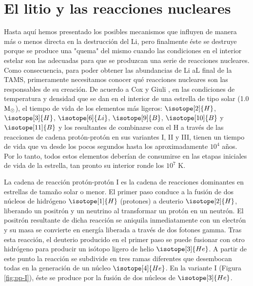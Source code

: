 \section{El litio y las reacciones nucleares} \label{sec:li_reac_nuc}
Hasta aquí hemos presentado los posibles mecanismos que influyen de manera más o menos directa en la destrucción del Li, pero finalmente éste se destruye porque se produce una "quema" del mismo cuando las condiciones en el interior estelar son las adecuadas para que se produzcan una serie de reacciones nucleares. Como consecuencia, para poder obtener las abundancias de Li aL final de la TAMS, primeramente necesitamos conocer qué reacciones nucleares son las responsables de su creación. De acuerdo a Cox y Giuli \cite{Cox1968}, en las condiciones de temperatura y densidad que se dan en el interior de una estrella de tipo solar (1.0 $\mathrm{M}_\odot$), el tiempo de vida de los elementos más ligeros: $\isotope[2]{H}$, $\isotope[3]{H}$, $\isotope[6]{Li}$, $\isotope[9]{B}$, $\isotope[10]{B}$ y $\isotope[11]{B}$ y los resultantes de combinarse con el H a través de las reacciones de cadena protón-protón en sus variantes I, II y III, tienen un tiempo de vida que va desde los pocos segundos hasta los aproximadamente $10^4$ años. Por lo tanto, todos estos elementos deberían de consumirse en las etapas iniciales de vida de la estrella, tan pronto su interior ronde los $10^7$ K.\par

La cadena de reacción protón-protón I es la cadena de reacciones dominantes en estrellas de tamaño solar o menor. El primer paso conduce a la fusión de dos núcleos de hidrógeno $\isotope[1]{H}$ (protones) a deuterio $\isotope[2]{H}$, liberando un positrón y un neutrino al transformar un protón en un neutrón. El positrón resultante de dicha reacción se aniquila inmediatamente con un electrón y su masa se convierte en energía liberada a través de dos fotones gamma. Tras esta reacción, el deuterio producido en el primer paso se puede fusionar con otro hidrógeno para producir un isótopo ligero de helio $\isotope[3]{He}$. A partir de este punto la reacción se subdivide en tres ramas diferentes que desembocan todas en la generación de un núcleo $\isotope[4]{He}$. En la variante I (Figura \ref{fig:pp-I}), éste se produce por la fusión de dos núcleos de $\isotope[3]{He}$.\par


